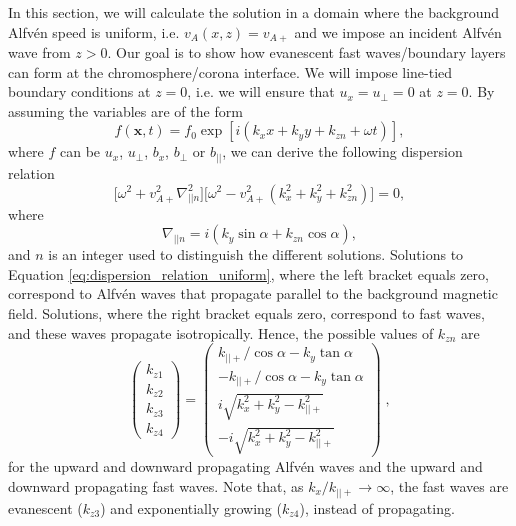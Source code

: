 \documentclass[linenumbers]{aastex63}
\let\vec\boldsymbol
\begin{document}
In this section, we will calculate the solution in a domain where the background Alfv\'en speed is uniform, i.e. $v_A(x,z)=v_{A+}$ and we impose an incident Alfv\'en wave from $z>0$. Our goal is to show how evanescent fast waves/boundary layers can form at the chromosphere/corona interface. We will impose line-tied boundary conditions at $z=0$, i.e. we will ensure that $u_x=u_\perp=0$ at $z=0$. By assuming the variables are of the form 
\begin{equation}
    f(\vec{x},t) = f_0 \exp[i(k_x x + k_y y + k_{zn} + \omega t)],
\end{equation}
where $f$ can be $u_x$, $u_\perp$, $b_x$, $b_\perp$ or $b_{||}$, we can derive the following dispersion relation
\begin{equation}
    \label{eq:dispersion_relation_uniform}
    \Big[\omega^2 + v_{A+}^2\nabla_{||n}^2\Big]\Big[\omega^2 - v_{A+}^2(k_x^2 + k_y^2 + k_{zn}^2)\Big]=0,
\end{equation}
where 
\begin{equation}
    \nabla_{||n} = i(k_y \sin\alpha + k_{zn}\cos\alpha),
\end{equation}
and $n$ is an integer used to distinguish the different solutions.
Solutions to Equation \eqref{eq:dispersion_relation_uniform}, where the left bracket equals zero, correspond to Alfv\'en waves that propagate parallel to the background magnetic field. Solutions, where the right bracket equals zero, correspond to fast waves, and these waves propagate isotropically.
Hence, the possible values of $k_{zn}$ are
\begin{equation}
    \begin{pmatrix}
    k_{z1} \\
    k_{z2} \\
    k_{z3} \\
    k_{z4}
    \end{pmatrix}
    =
    \begin{pmatrix}
    k_{||+} / \cos\alpha - k_y \tan\alpha \\
    -k_{||+} / \cos\alpha - k_y \tan\alpha \\
    i\sqrt{k_x^2 + k_y^2 - k_{||+}^2} \\
    -i\sqrt{k_x^2 + k_y^2 - k_{||+}^2}
    \end{pmatrix}\; ,
\end{equation}
for the upward and downward propagating Alfv\'en waves and the
upward and downward propagating fast waves. Note that, as $k_x/k_{||+} \rightarrow \infty$, 
the fast waves are evanescent ($k_{z3}$) and 
exponentially growing ($k_{z4}$), instead of propagating.
\end{document}
